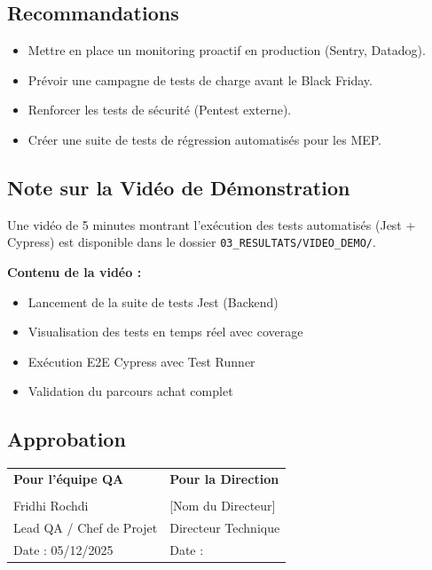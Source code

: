 \documentclass[12pt,a4paper]{article}
\begin{document}
\subsection{Recommandations}
\begin{itemize}
    \item Mettre en place un monitoring proactif en production (Sentry, Datadog).
    \item Prévoir une campagne de tests de charge avant le Black Friday.
    \item Renforcer les tests de sécurité (Pentest externe).
    \item Créer une suite de tests de régression automatisés pour les MEP.
\end{itemize}

\subsection{Note sur la Vidéo de Démonstration}
Une vidéo de 5 minutes montrant l'exécution des tests automatisés (Jest + Cypress) est disponible dans le dossier \texttt{03\_RESULTATS/VIDEO\_DEMO/}.

\textbf{Contenu de la vidéo :}
\begin{itemize}
    \item Lancement de la suite de tests Jest (Backend)
    \item Visualisation des tests en temps réel avec coverage
    \item Exécution E2E Cypress avec Test Runner
    \item Validation du parcours achat complet
\end{itemize}

\subsection{Approbation}
\vspace{2cm}
\begin{tabularx}{\textwidth}{|X|X|}
    \hline
    \textbf{Pour l'équipe QA} & \textbf{Pour la Direction} \\
    \vspace{3cm} & \vspace{3cm} \\
    Fridhi Rochdi & [Nom du Directeur] \\
    Lead QA / Chef de Projet & Directeur Technique \\
    Date : 05/12/2025 & Date : \\ \hline
\end{tabularx}
\end{document}
